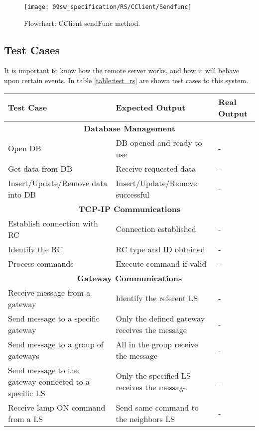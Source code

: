 \begin{figure}[H]
	\centering
	\texttt{[image: 09sw\_specification/RS/CClient/Sendfunc]}
	\caption{Flowchart: CClient sendFunc method.}
	\label{fig:RSsendfunc}
\end{figure}

\clearpage
\subsection{Test Cases}
It is important to know how the remote server works, and how it will behave upon certain events. In table \ref{table:test_rs} are shown test cases to this system.

\begin{table}[H]
	\centering
	\begin{threeparttable}
	\resizebox{\columnwidth}{!}
	{
		\begin{tabular}{|m{4cm}|m{5cm}||m{5cm}|}
			\hline
			\textbf{Test Case} & \textbf{Expected Output} & \textbf{Real Output}
			\\\hline\hline
			\multicolumn{3}{c}{\textbf{Database Management}}\\\hline
			Open DB & DB opened and ready to use & -
			\\\hline
			Get data from DB & Receive requested data & -
			\\\hline
			Insert/Update/Remove data into DB & Insert/Update/Remove successful & -
			\\\hline
			
			\multicolumn{3}{c}{\textbf{TCP-IP Communications}}\\\hline
			Establish connection with RC & Connection established & -
			\\\hline
			Identify the RC & RC type and ID obtained & -
			\\\hline
			Process commands & Execute command if valid & -
			\\\hline
			
			\multicolumn{3}{c}{\textbf{Gateway Communications}}\\\hline
			Receive message from a gateway & Identify the referent LS & -
			\\\hline
			Send message to a specific gateway & Only the defined gateway receives the message & - 
			\\\hline
			Send message to a group of gateways & All in the group receive the message & -
			\\\hline
			Send message to the gateway connected to a specific LS & Only the specified LS receives the message & -
			\\\hline
			Receive lamp ON command from a LS & Send same command to the neighbors LS & -
			\\\hline
			

\end{tabular}}
\end{threeparttable}
\end{table}
